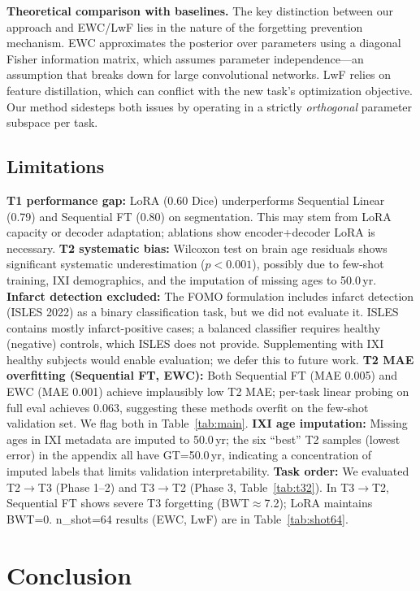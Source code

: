 \documentclass[journal,twoside,web]{ieeecolor}
\begin{document}
\textbf{Theoretical comparison with baselines.} The key distinction between our approach and EWC/LwF lies in the nature of the forgetting prevention mechanism. EWC approximates the posterior over parameters using a diagonal Fisher information matrix, which assumes parameter independence---an assumption that breaks down for large convolutional networks. LwF relies on feature distillation, which can conflict with the new task's optimization objective. Our method sidesteps both issues by operating in a strictly \emph{orthogonal} parameter subspace per task.

\subsection{Limitations}
\label{sec:limitations}

\textbf{T1 performance gap:} LoRA (0.60 Dice) underperforms Sequential Linear (0.79) and Sequential FT (0.80) on segmentation. This may stem from LoRA capacity or decoder adaptation; ablations show encoder+decoder LoRA is necessary. \textbf{T2 systematic bias:} Wilcoxon test on brain age residuals shows significant systematic underestimation ($p<0.001$), possibly due to few-shot training, IXI demographics, and the imputation of missing ages to 50.0\,yr. \textbf{Infarct detection excluded:} The FOMO formulation includes infarct detection (ISLES 2022) as a binary classification task, but we did not evaluate it. ISLES contains mostly infarct-positive cases; a balanced classifier requires healthy (negative) controls, which ISLES does not provide. Supplementing with IXI healthy subjects would enable evaluation; we defer this to future work. \textbf{T2 MAE overfitting (Sequential FT, EWC):} Both Sequential FT (MAE 0.005) and EWC (MAE 0.001) achieve implausibly low T2 MAE; per-task linear probing on full eval achieves 0.063, suggesting these methods overfit on the few-shot validation set. We flag both in Table~\ref{tab:main}. \textbf{IXI age imputation:} Missing ages in IXI metadata are imputed to 50.0\,yr; the six ``best'' T2 samples (lowest error) in the appendix all have GT=50.0\,yr, indicating a concentration of imputed labels that limits validation interpretability. \textbf{Task order:} We evaluated T2$\to$T3 (Phase 1--2) and T3$\to$T2 (Phase 3, Table~\ref{tab:t32}). In T3$\to$T2, Sequential FT shows severe T3 forgetting (BWT$\approx$7.2); LoRA maintains BWT=0. n\_shot=64 results (EWC, LwF) are in Table~\ref{tab:shot64}.

\section{Conclusion}
\label{sec:conclusion}
\end{document}
